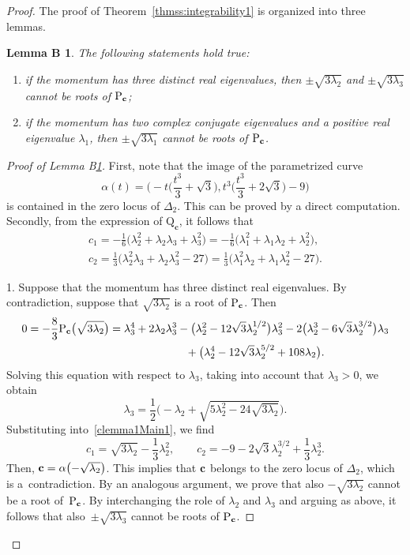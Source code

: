 \documentclass[10pt,a4paper]{amsart}
\numberwithin{equation}{section}
\newtheorem{lemmaB}{Lemma B\ignorespaces}
\begin{document}
\begin{proof} The proof of Theorem~\ref{thmss:integrability1} is organized into three lemmas.

\begin{lemmaB}\label{lemma1Main1}
The following statements hold true:
\begin{enumerate}\itemsep=0pt
\item[$(1)$] if the momentum has three distinct real eigenvalues, then $\pm \sqrt{3\lambda_2}$ and $\pm\sqrt{3\lambda_3}$
cannot be roots of ${\rm P}_{{\bf c}}$;
\item[$(2)$] if the momentum has two complex conjugate eigenvalues and a positive real eigenvalue $\lambda_1$, then $\pm \sqrt{3\lambda_1}$ cannot be roots of ${\rm P}_{{\bf c}}$.
\end{enumerate}
\end{lemmaB}

\begin{proof}[Proof of Lemma B\ref{lemma1Main1}]
First, note that the image of the parametrized curve
\[
 \alpha(t)=\biggl(-t\bigg(\frac{t^3}{3}+\sqrt{3}\bigg),t^3\bigg(\frac{t^3}{3}+2\sqrt{3}\bigg)-9\biggr)
\]
is contained in the zero locus of $\Delta_2$. This can be proved by a direct computation. Secondly,
from the expression of $\mathrm{Q}_\mathbf{c}$, it follows that
\begin{gather}
c_1=-\frac{1}{6}\big(\lambda_2^2+\lambda_2\lambda_3+\lambda_3^2\big)=-\frac{1}{6}\big(\lambda_1^2+\lambda_1\lambda_2+\lambda_2^2\big), \nonumber\\
 c_2=\frac{1}{3}\big(\lambda_2^2\lambda_3+\lambda_2\lambda_3^2-27\big)=\frac{1}{3}\big(\lambda_1^2\lambda_2+\lambda_1\lambda_2^2-27\big).\label{clemma1Main1}
 \end{gather}

1. Suppose that the momentum has three distinct real eigenvalues.
By contradiction, suppose that $\sqrt{3\lambda_2}$ is a root of ${\rm P}_{{\bf c}}$. Then
\begin{gather*}
0=-\frac{8}{3}{\rm P}_{{\bf c}}\big(\sqrt{3\lambda_2}\big) =\lambda_3^4+2\lambda_2\lambda_3^3-\big(\lambda_2^2-12\sqrt{3}\lambda_2^{1/2}\big)\lambda_3^2-2\big(\lambda_2^3-6\sqrt{3}\lambda_2^{3/2}\big)\lambda_3\\
\hphantom{0=-\frac{8}{3}{\rm P}_{{\bf c}}\big(\sqrt{3\lambda_2}\big) =}{}
+\big(\lambda_2^4-12\sqrt{3}\lambda_2^{5/2}+108\lambda_2\big).
\end{gather*}
Solving this equation with respect to $\lambda_3$, {taking into account that $\lambda_3>0$}, we obtain
\[
 \lambda_3=\frac{1}{2}\biggl(-\lambda_2+\sqrt{5\lambda_2^2-24\sqrt{3\lambda_2}}\biggr).
\]
Substituting into~\eqref{clemma1Main1}, we find
\[
 c_1=\sqrt{3\lambda_2}-\frac{1}{3}\lambda_2^2,\qquad c_2=-9-2\sqrt{3}\lambda_2^{3/2}+\frac{1}{3}\lambda_2^3.
\]
Then, ${\bf c}=\alpha\bigl(-\sqrt{\lambda_2}\bigr)$. This implies that ${\bf c}$ belongs to the zero locus of $\Delta_2$,
which is a~contradiction.
By an analogous argument, we prove that also $-\sqrt{3\lambda_2}$ cannot be a root of~${\rm P}_{{\bf c}}$.
By interchanging the role of $\lambda_2$ and $\lambda_3$ and arguing as above, it follows that
also~$\pm\sqrt{3\lambda_3}$ cannot be roots of ${\rm P}_{{\bf c}}$.


\end{proof}
\end{proof}
\end{document}
